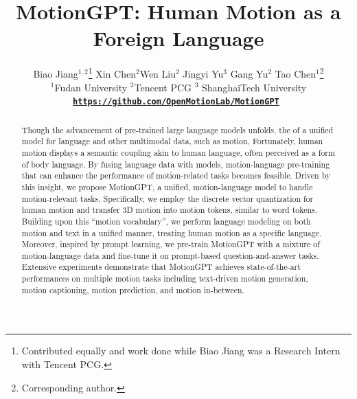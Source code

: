 \documentclass{article}
\title{MotionGPT: Human Motion as a Foreign Language}
\author{Biao Jiang$^{1,2}$\thanks{Contributed equally and work done while Biao Jiang was a Research Intern with Tencent PCG.} \quad\quad Xin Chen$^{2}$\footnotemark[1] \quad\quad Wen Liu$^{2}$ \quad\quad Jingyi Yu$^{3}$ \quad\quad Gang Yu$^{2}$ \quad\quad Tao Chen$^{1}$\thanks{Corresponding author.} 
\\ $^{1}$Fudan University \quad\quad\quad$^{2}$Tencent PCG \quad\quad\quad$^{3}$ ShanghaiTech University \\
\tt \small \textbf{\href{https://github.com/OpenMotionLab/MotionGPT}{https://github.com/OpenMotionLab/MotionGPT}}
}
\begin{document}
\maketitle


\begin{abstract}
  Though the advancement of pre-trained large language models unfolds, the  of  a unified model for language and other multimodal data, such as motion,  %
  Fortunately, human motion displays a semantic coupling akin to human language, often perceived as a form of body language.
  By fusing language data with  models,%
  motion-language pre-training that can enhance the performance of motion-related tasks becomes feasible. %
  Driven by this insight, we propose MotionGPT, a unified,  motion-language model to handle  motion-relevant tasks.
  Specifically, we employ the discrete vector quantization for human motion and transfer 3D motion into motion tokens, similar to  word tokens. 
  Building upon this ``motion vocabulary'', we perform language modeling on both motion and text in a unified manner, treating human motion as a specific language.
  Moreover, inspired by prompt learning, we pre-train MotionGPT with a mixture of motion-language data and fine-tune it on prompt-based question-and-answer tasks.
  Extensive experiments demonstrate that MotionGPT achieves state-of-the-art performances on multiple motion tasks including text-driven motion generation, motion captioning, motion prediction, and motion in-between.
  
\end{abstract}






% 

\end{document}
